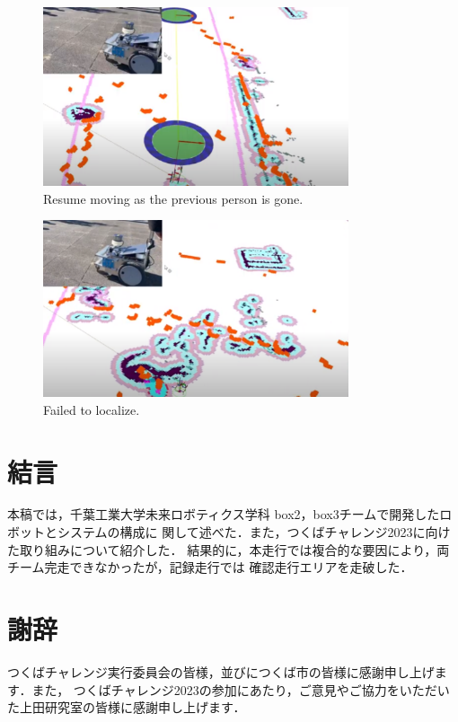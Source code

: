 \documentclass[twocolumn, 9pt]{jsproceedings}
\begin{document}
\vspace*{2mm}

\begin{figure}[H]
  \centering
  \includegraphics[width=90mm]{fig/box3_2.pdf}
  \caption{Resume moving as the previous person is gone.}
  \label{fig:box3-result-2}
\end{figure}

\vspace*{2mm}

\begin{figure}[H]
  \centering
  \includegraphics[width=90mm]{fig/box3_3.pdf}
  \caption{Failed to localize.}
  \label{fig:box3-result-3}
\end{figure}

\vspace*{3mm}

\section{結言}
本稿では，千葉工業大学未来ロボティクス学科 box2，box3チームで開発したロボットとシステムの構成に
関して述べた．また，つくばチャレンジ2023に向けた取り組みについて紹介した．
結果的に，本走行では複合的な要因により，両チーム完走できなかったが，記録走行では
確認走行エリアを走破した．

\vspace*{12.3mm}


\section*{謝辞}
つくばチャレンジ実行委員会の皆様，並びにつくば市の皆様に感謝申し上げます．また，
つくばチャレンジ2023の参加にあたり，ご意見やご協力をいただいた上田研究室の皆様に感謝申し上げます．
\end{document}
